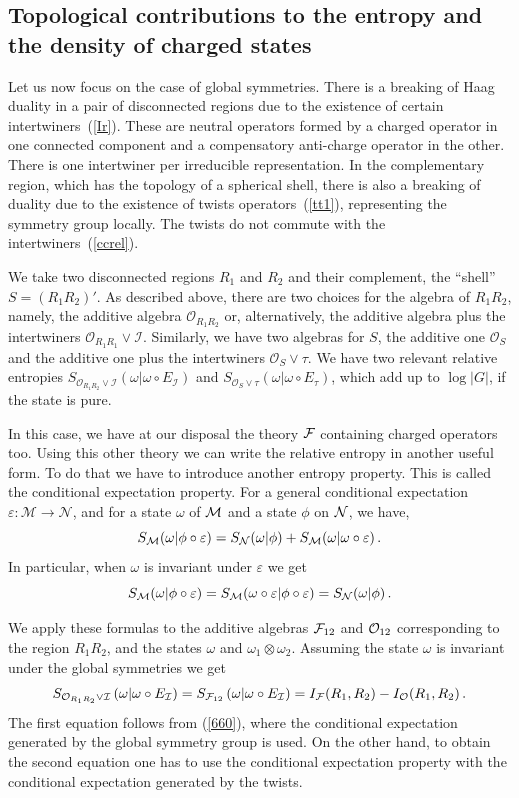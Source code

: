 \documentclass[11pt]{article}
\numberwithin{equation}{section}
\newcommand{\be}{\begin{equation}}
\newcommand{\ee}{\end{equation}}
\begin{document}
\subsection{Topological contributions to the entropy and the density of charged states}

Let us now focus on the case of global symmetries. There is a breaking of Haag duality in a pair of disconnected regions due to the existence of certain intertwiners~(\ref{Ir}). These are neutral operators formed by a charged operator in one connected component and a compensatory anti-charge operator in the other. There is one intertwiner per irreducible representation. In the complementary region, which has the topology of a spherical shell, there is also a breaking of duality due to the existence of twists operators~(\ref{tt1}), representing the symmetry group locally. The twists do not commute with the intertwiners~(\ref{ccrel}).  

We take two disconnected regions $R_1$ and $R_2$ and their complement, the ``shell''  $S=(R_1 R_2)'$. As described above, there are  two choices for the algebra of $R_1 R_2$, namely, the additive algebra $\mathcal{O}_{R_1R_2}$ or, alternatively, the additive algebra plus the intertwiners $\mathcal{O}_{R_1R_1}\vee \mathcal{I}$. Similarly, we have two algebras for $S$, the additive one $\mathcal{O}_{S}$ and the additive one plus the intertwiners $\mathcal{O}_{S}\vee \tau$. 
We have two relevant relative entropies 
$
S_{\mathcal{O}_{R_1R_2}\vee \mathcal{I}}\left(\omega|\omega\circ E_\mathcal{I}\right)$ and $S_{\mathcal{O}_{S}\vee \tau}\left(\omega|\omega\circ E_\tau\right)$, which add up to $\log|G|$, if the state is pure.  

In this case, we have at our disposal the theory ${\cal F}$ containing charged operators too. Using this other theory we can write the relative entropy in another useful form. To do that we have to introduce another entropy property. This is called 
 the conditional expectation property. For a general conditional expectation $\varepsilon : \mathcal{M}\rightarrow \mathcal{N}$, and for a state $\omega$ of ${\cal M}$ and a state $\phi$ on ${\cal N}$, we have,
\be
S_{\cal M}(\omega|\phi\circ \varepsilon)=S_{\cal N}(\omega|\phi)+S_{\cal M}(\omega|\omega\circ \varepsilon)\,.
\ee
In particular, when $\omega$ is invariant under $\varepsilon$ we get
\be
S_{\cal M}(\omega|\phi\circ \varepsilon)=S_{\cal M}(\omega\circ \varepsilon|\phi\circ \varepsilon)=S_{\cal N}(\omega|\phi)\,.\label{660}
\ee

We apply these formulas to the additive algebras ${\cal F}_{12}$ and ${\cal O}_{12}$ corresponding to the region $R_1R_2$, and the  states $\omega$ and $\omega_1\otimes \omega_2$. Assuming the state $\omega$ is invariant under the global symmetries we get 
\be
 S_{\mathcal{O}_{R_1R_2}\vee \mathcal{I}}\left(\omega|\omega\circ E_\mathcal{I}\right)= S_{{\cal F}_{12}}\left(\omega|\omega\circ E_\mathcal{I}\right)=I_{{\cal F}}(R_1,R_2)-I_{\cal O}(R_1,R_2)\,.
\label{mutualdif}\ee 
The first equation follows from (\ref{660}), where the conditional expectation generated by the global symmetry group is used.  On the other hand, to obtain the second equation one has to use the conditional expectation property with the conditional expectation generated by the twists.   
\end{document}
